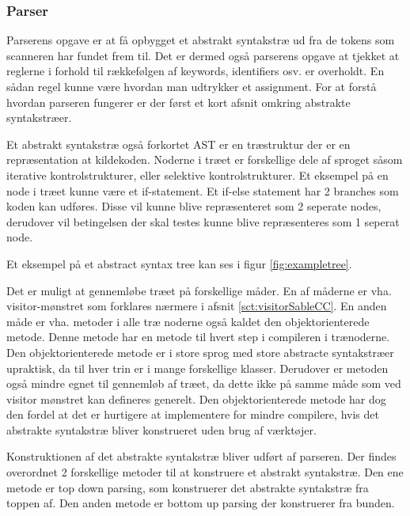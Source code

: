 \subsubsection{Parser}
Parserens opgave er at få opbygget et abstrakt syntakstræ ud fra de tokens som scanneren har fundet frem til. Det er dermed også parserens opgave at tjekket at reglerne i forhold til rækkefølgen af keywords, identifiers osv. er overholdt. En sådan regel kunne være hvordan man udtrykker et assignment. For at forstå hvordan parseren fungerer er der først et kort afsnit omkring abstrakte syntakstræer.

Et abstrakt syntakstræ også forkortet AST er en træstruktur der er en repræsentation at kildekoden. Noderne i træet er forskellige dele af sproget såsom iterative kontrolstrukturer, eller selektive kontrolstrukturer. Et eksempel på en node i træet kunne være et if-statement. Et if-else statement har 2 branches som koden kan udføres. Disse vil kunne blive repræsenteret som 2 seperate nodes, derudover vil betingelsen der skal testes kunne blive repræsenteres som 1 seperat node.

\noindent Et eksempel på et abstract syntax tree kan ses i figur \ref{fig:exampletree}.


\noindent Det er muligt at gennemløbe træet på forskellige måder. En af måderne er vha. visitor-mønstret som forklares nærmere i afsnit \ref{sct:visitorSableCC}. En anden måde er vha. metoder i alle træ noderne også kaldet den objektorienterede metode. Denne metode har en metode til hvert step i compileren i trænoderne. Den objektorienterede metode er i store sprog med  store abstracte syntakstræer upraktisk, da til hver trin er i mange forskellige klasser. Derudover er metoden også mindre egnet til gennemløb af træet, da dette ikke på samme måde som ved visitor mønstret kan defineres generelt. Den objektorienterede metode har dog den fordel at det er hurtigere at implementere for mindre compilere, hvis det abstrakte syntakstræ bliver konstrueret uden brug af værktøjer.

Konstruktionen af det abstrakte syntakstræ bliver udført af parseren. Der findes overordnet 2 forskellige metoder til at konstruere et abstrakt syntakstræ. Den ene metode er top down parsing, som konstruerer det abstrakte syntakstræ fra toppen af. Den anden metode er bottom up parsing der konstruerer fra bunden.

